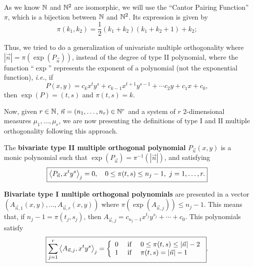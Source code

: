 \documentclass[portrait,final,a0paper,fontscale=0.38]{baposter}
\begin{document}
\begin{poster}
{As we know $\mathbb{N}$ and $\mathbb{N}^2$ are isomorphic, we will use the ``Cantor Pairing Function'' $\pi$, which is a bijection between $\mathbb{N}$ and $\mathbb{N}^2$. Its expression is given by 
$$
\pi(k_1, k_2) = \dfrac{1}{2}(k_1 + k_2)(k_1 + k_2 + 1) + k_2;
$$

Thus, we tried to do a generalization of univariate multiple orthogonality where $|\vec n| = \pi(\exp(P_{\vec n}))$, instead of the degree of type II polynomial, where the function ``$\exp$'' represents the exponent of a polynomial (not the exponential function), \textit{i.e.}, if $$P(x,y)= c_{k} x^t y^s + c_{k-1} x^{t+1} y^{s-1} + \cdots c_2 y + c_1 x + c_0,$$ then $\exp(P)=(t,s)$ and $\pi(t,s)=k$.

Now, given $r\in\mathbb{N}$, $\vec n = (n_1,\dots, n_r)\in\mathbb{N}^r$ and a system of $r$ $2$-dimensional measures $\mu_1, \dots, \mu_r$, we are now presenting the definitions of type I and II multiple orthogonality following this approach. 

\begin{definition}
  The \textbf{bivariate type II multiple orthogonal polynomial} $P_{\vec n}(x,y)$ is a monic polynomial such that $\exp(P_{\vec n})=\pi^{-1}(|\vec n|)$,  and satisfying
  \begin{equation}
    \label{eq:typeII-MOP-2-app}
    \boxed{
    \left\langle P_{\vec n} , x^t y^s \right\rangle_j = 0, \ \ \ 0\leq \pi(t,s)\leq n_j-1, \ j=1,\dots,r.}
  \end{equation}    
\end{definition}

\begin{definition}
  \textbf{Bivariate type I multiple orthogonal polynomials} are presented in a vector $(A_{\vec n,1}(x,y),\dots,A_{\vec n,r}(x,y))$ where $\pi(\exp(A_{\vec n,j})) \leq n_j-1$. This means that, if $n_j-1 = \pi(t_j,s_j)$, then $A_{\vec n,j} = c_{n_j-1} x^{t_j}y^{s_j}+\cdots + c_0$. This polynomials satisfy
  \begin{equation}
    \label{eq:condition-type-I-2-app}
    \boxed{\sum_{j=1}^r \left\langle A_{\vec n,j} , x^t y^s \right\rangle_j = \left\{\begin{array}{ccl}
        0 &   \text{ if } & 0\leq \pi(t,s)\leq |\vec n|-2 \\
        1 & \text{ if } & \pi(t,s)= |\vec n|-1     
    \end{array}\right.}.
  \end{equation}
\end{definition}

}
\end{poster}
\end{document}
